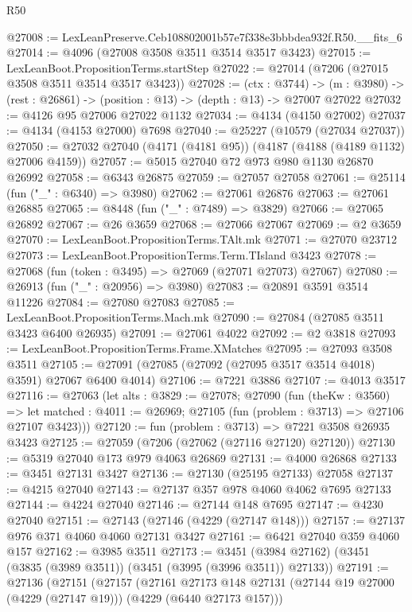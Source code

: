\begin{lexlean}{R50}
\begin{coremodule}
@27008 := LexLeanPreserve.Ceb108802001b57e7f338e3bbbdea932f.R50.__fits_6
@27014 := @4096 (@27008 @3508 @3511 @3514 @3517 @3423)
@27015 := LexLeanBoot.PropositionTerms.startStep
@27022 := @27014 (@7206 (@27015 @3508 @3511 @3514 @3517 @3423))
@27028 := (ctx : @3744) ->
  (m : @3980) -> (rest : @26861) -> (position : @13) -> (depth : @13) -> @27007 @27022
@27032 := @4126 @95 @27006 @27022 @1132
@27034 := @4134 (@4150 @27002)
@27037 := @4134 (@4153 @27000) @7698
@27040 := @25227 (@10579 (@27034 @27037))
@27050 := @27032 @27040 (@4171 (@4181 @95)) (@4187 (@4188 (@4189 @1132) @27006 @4159))
@27057 := @5015 @27040 @72 @973 @980 @1130 @26870 @26992
@27058 := @6343 @26875
@27059 := @27057 @27058
@27061 := @25114 (fun ("_" : @6340) => @3980)
@27062 := @27061 @26876
@27063 := @27061 @26885
@27065 := @8448 (fun ("_" : @7489) => @3829)
@27066 := @27065 @26892
@27067 := @26 @3659
@27068 := @27066 @27067
@27069 := @2 @3659
@27070 := LexLeanBoot.PropositionTerms.TAlt.mk
@27071 := @27070 @23712
@27073 := LexLeanBoot.PropositionTerms.Term.TIsland @3423
@27078 := @27068 (fun (token : @3495) => @27069 (@27071 @27073) @27067)
@27080 := @26913 (fun ("_" : @20956) => @3980)
@27083 := @20891 @3591 @3514 @11226
@27084 := @27080 @27083
@27085 := LexLeanBoot.PropositionTerms.Mach.mk
@27090 := @27084 (@27085 @3511 @3423 @6400 @26935)
@27091 := @27061 @4022
@27092 := @2 @3818
@27093 := LexLeanBoot.PropositionTerms.Frame.XMatches
@27095 := @27093 @3508 @3511
@27105 := @27091 (@27085 (@27092 (@27095 @3517 @3514 @4018) @3591) @27067 @6400 @4014)
@27106 := @7221 @3886
@27107 := @4013 @3517
@27116 := @27063
    (let alts : @3829 := @27078;
    @27090
      (fun (theKw : @3560) =>
      let matched : @4011 := @26969; @27105 (fun (problem : @3713) => @27106 @27107 @3423)))
@27120 := fun (problem : @3713) => @7221 @3508 @26935 @3423
@27125 := @27059 (@7206 (@27062 (@27116 @27120) @27120))
@27130 := @5319 @27040 @173 @979 @4063 @26869
@27131 := @4000 @26868
@27133 := @3451 @27131 @3427
@27136 := @27130 (@25195 @27133) @27058
@27137 := @4215 @27040
@27143 := @27137 @357 @978 @4060 @4062 @7695 @27133
@27144 := @4224 @27040
@27146 := @27144 @148 @7695
@27147 := @4230 @27040
@27151 := @27143 (@27146 (@4229 (@27147 @148)))
@27157 := @27137 @976 @371 @4060 @4060 @27131 @3427
@27161 := @6421 @27040 @359 @4060 @157
@27162 := @3985 @3511
@27173 := @3451 (@3984 @27162) (@3451 (@3835 (@3989 @3511)) (@3451 (@3995 (@3996 @3511)) @27133))
@27191 := @27136
    (@27151
      (@27157
        (@27161
          @27173
          @148
          @27131
          (@27144 @19 @27000 (@4229 (@27147 @19)))
          (@4229 (@6440 @27173 @157)))

\end{coremodule}
\end{lexlean}
